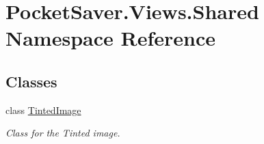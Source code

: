 \hypertarget{namespace_pocket_saver_1_1_views_1_1_shared}{}\section{Pocket\+Saver.\+Views.\+Shared Namespace Reference}
\label{namespace_pocket_saver_1_1_views_1_1_shared}
\subsection*{Classes}
\begin{DoxyCompactItemize}
\item 
class \hyperlink{class_pocket_saver_1_1_views_1_1_shared_1_1_tinted_image}{Tinted\+Image}
\begin{DoxyCompactList}\small\item\em Class for the Tinted image. \end{DoxyCompactList}\end{DoxyCompactItemize}
